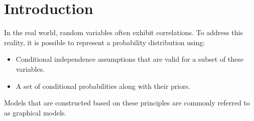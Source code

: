 \section{Introduction}

In the real world, random variables often exhibit correlations. To address this reality, it is possible to represent a probability distribution using:
\begin{itemize}
    \item Conditional independence assumptions that are valid for a subset of these variables.
    \item A set of conditional probabilities along with their priors.
\end{itemize}
Models that are constructed based on these principles are commonly referred to as graphical models.